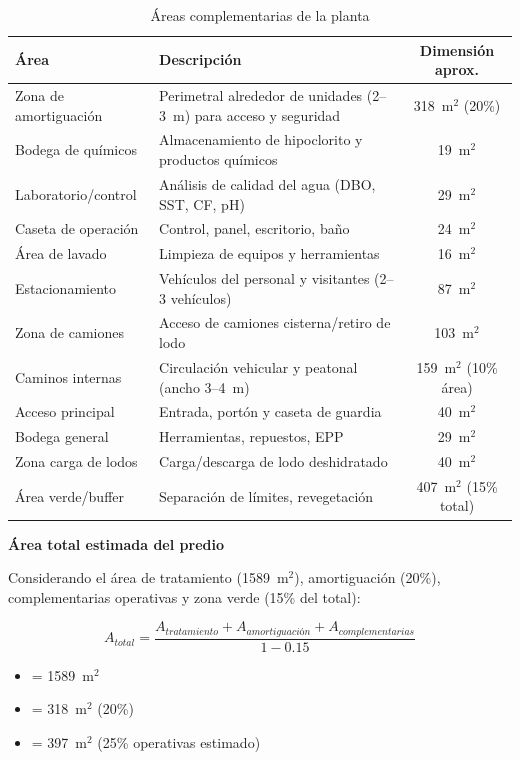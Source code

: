 \documentclass[12pt,a4paper]{article}
\begin{document}
\begin{table}[H]
\centering
\caption{Áreas complementarias de la planta}
\small
\begin{tabular}{lp{8cm}c}
\toprule
Área & Descripción & Dimensión aprox. \\
\midrule
Zona de amortiguación & Perimetral alrededor de unidades (2--3~m) para acceso y seguridad & 318~m$^2$ (20\%) \\
\addlinespace
Bodega de químicos & Almacenamiento de hipoclorito y productos químicos & 19~m$^2$ \\
\addlinespace
Laboratorio/control & Análisis de calidad del agua (DBO, SST, CF, pH) & 29~m$^2$ \\
\addlinespace
Caseta de operación & Control, panel, escritorio, baño & 24~m$^2$ \\
\addlinespace
Área de lavado & Limpieza de equipos y herramientas & 16~m$^2$ \\
\addlinespace
Estacionamiento & Vehículos del personal y visitantes (2--3 vehículos) & 87~m$^2$ \\
\addlinespace
Zona de camiones & Acceso de camiones cisterna/retiro de lodo & 103~m$^2$ \\
\addlinespace
Caminos internas & Circulación vehicular y peatonal (ancho 3--4~m) & 159~m$^2$ (10\% área) \\
\addlinespace
Acceso principal & Entrada, portón y caseta de guardia & 40~m$^2$ \\
\addlinespace
Bodega general & Herramientas, repuestos, EPP & 29~m$^2$ \\
\addlinespace
Zona carga de lodos & Carga/descarga de lodo deshidratado & 40~m$^2$ \\
\addlinespace
Área verde/buffer & Separación de límites, revegetación & 407~m$^2$ (15\% total) \\
\bottomrule
\end{tabular}
\end{table}

\textbf{Área total estimada del predio}

Considerando el área de tratamiento (1589~m$^2$), amortiguación (20\%), complementarias operativas y zona verde (15\% del total):

\begin{equation}
A_{total} = \frac{A_{tratamiento} + A_{amortiguación} + A_{complementarias}}{1 - 0.15}
\end{equation}

\begin{itemize}[noitemsep,leftmargin=2em]
    \item[$A_{tratamiento}$] = 1589~m$^2$
    \item[$A_{amortiguación}$] = 318~m$^2$ (20\%)
    \item[$A_{complementarias}$] = 397~m$^2$ (25\% operativas estimado)
\end{itemize}
\end{document}
